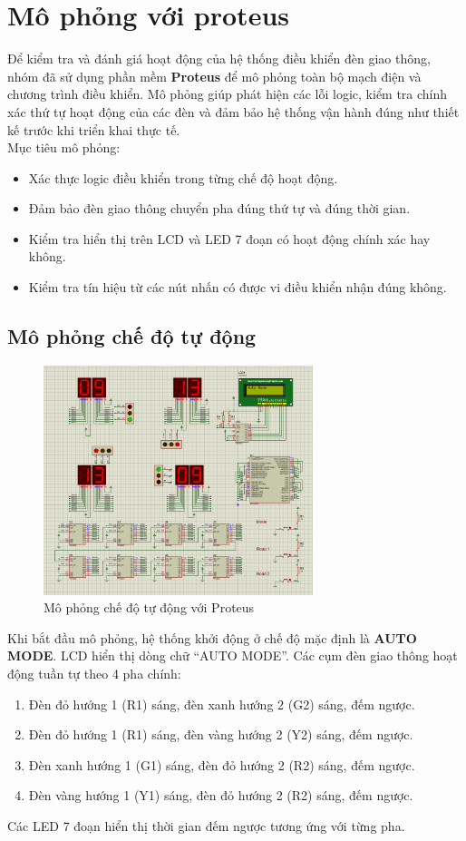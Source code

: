 \section{Mô phỏng với proteus}
Để kiểm tra và đánh giá hoạt động của hệ thống điều khiển đèn giao thông, nhóm đã sử dụng phần mềm \textbf{Proteus} để mô phỏng toàn bộ mạch điện và chương trình điều khiển. Mô phỏng giúp phát hiện các lỗi logic, kiểm tra chính xác thứ tự hoạt động của các đèn và đảm bảo hệ thống vận hành đúng như thiết kế trước khi triển khai thực tế. \\

Mục tiêu mô phỏng:
\begin{itemize}
    \item Xác thực logic điều khiển trong từng chế độ hoạt động.
    \item Đảm bảo đèn giao thông chuyển pha đúng thứ tự và đúng thời gian.
    \item Kiểm tra hiển thị trên LCD và LED 7 đoạn có hoạt động chính xác hay không.
    \item Kiểm tra tín hiệu từ các nút nhấn có được vi điều khiển nhận đúng không.
\end{itemize}
\subsection{Mô phỏng chế độ tự động}
\begin{figure}[H]
    \centering
    \includegraphics[width=0.7\textwidth]{pictures/autoproteus.png}
    \caption{Mô phỏng chế độ tự động với Proteus}
\end{figure}
Khi bắt đầu mô phỏng, hệ thống khởi động ở chế độ mặc định là \textbf{AUTO MODE}. LCD hiển thị dòng chữ “AUTO MODE”. Các cụm đèn giao thông hoạt động tuần tự theo 4 pha chính:
\begin{enumerate}
    \item Đèn đỏ hướng 1 (R1) sáng, đèn xanh hướng 2 (G2) sáng, đếm ngược.
    \item Đèn đỏ hướng 1 (R1) sáng, đèn vàng hướng 2 (Y2) sáng, đếm ngược.
    \item Đèn xanh hướng 1 (G1) sáng, đèn đỏ hướng 2 (R2) sáng, đếm ngược.
    \item Đèn vàng hướng 1 (Y1) sáng, đèn đỏ hướng 2 (R2) sáng, đếm ngược.
\end{enumerate}
Các LED 7 đoạn hiển thị thời gian đếm ngược tương ứng với từng pha.

